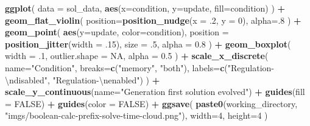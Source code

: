 \documentclass[
]{book}
\newenvironment{Shaded}{\begin{snugshade}}{\end{snugshade}}
\newcommand{\CharTok}[1]{\textcolor[rgb]{0.31,0.60,0.02}{#1}}
\newcommand{\DataTypeTok}[1]{\textcolor[rgb]{0.13,0.29,0.53}{#1}}
\newcommand{\DecValTok}[1]{\textcolor[rgb]{0.00,0.00,0.81}{#1}}
\newcommand{\FloatTok}[1]{\textcolor[rgb]{0.00,0.00,0.81}{#1}}
\newcommand{\KeywordTok}[1]{\textcolor[rgb]{0.13,0.29,0.53}{\textbf{#1}}}
\newcommand{\NormalTok}[1]{#1}
\newcommand{\OperatorTok}[1]{\textcolor[rgb]{0.81,0.36,0.00}{\textbf{#1}}}
\newcommand{\OtherTok}[1]{\textcolor[rgb]{0.56,0.35,0.01}{#1}}
\newcommand{\StringTok}[1]{\textcolor[rgb]{0.31,0.60,0.02}{#1}}
\begin{document}
\begin{Shaded}
\begin{Highlighting}[]
\KeywordTok{ggplot}\NormalTok{( }\DataTypeTok{data =}\NormalTok{ sol\_data, }\KeywordTok{aes}\NormalTok{(}\DataTypeTok{x=}\NormalTok{condition, }\DataTypeTok{y=}\NormalTok{update, }\DataTypeTok{fill=}\NormalTok{condition) ) }\OperatorTok{+}
\StringTok{  }\KeywordTok{geom\_flat\_violin}\NormalTok{(}
    \DataTypeTok{position=}\KeywordTok{position\_nudge}\NormalTok{(}\DataTypeTok{x =} \FloatTok{.2}\NormalTok{, }\DataTypeTok{y =} \DecValTok{0}\NormalTok{),}
    \DataTypeTok{alpha=}\NormalTok{.}\DecValTok{8}
\NormalTok{  ) }\OperatorTok{+}
\StringTok{  }\KeywordTok{geom\_point}\NormalTok{(}
    \KeywordTok{aes}\NormalTok{(}\DataTypeTok{y=}\NormalTok{update, }\DataTypeTok{color=}\NormalTok{condition),}
    \DataTypeTok{position =} \KeywordTok{position\_jitter}\NormalTok{(}\DataTypeTok{width =} \FloatTok{.15}\NormalTok{),}
    \DataTypeTok{size =} \FloatTok{.5}\NormalTok{,}
    \DataTypeTok{alpha =} \FloatTok{0.8}
\NormalTok{  ) }\OperatorTok{+}
\StringTok{  }\KeywordTok{geom\_boxplot}\NormalTok{(}
    \DataTypeTok{width =} \FloatTok{.1}\NormalTok{,}
    \DataTypeTok{outlier.shape =} \OtherTok{NA}\NormalTok{,}
    \DataTypeTok{alpha =} \FloatTok{0.5}
\NormalTok{  ) }\OperatorTok{+}
\StringTok{  }\KeywordTok{scale\_x\_discrete}\NormalTok{(}
    \DataTypeTok{name=}\StringTok{"Condition"}\NormalTok{,}
    \DataTypeTok{breaks=}\KeywordTok{c}\NormalTok{(}\StringTok{"memory"}\NormalTok{, }\StringTok{"both"}\NormalTok{),}
    \DataTypeTok{labels=}\KeywordTok{c}\NormalTok{(}\StringTok{"Regulation{-}}\CharTok{\textbackslash{}n}\StringTok{disabled"}\NormalTok{, }\StringTok{"Regulation{-}}\CharTok{\textbackslash{}n}\StringTok{enabled"}\NormalTok{)}
\NormalTok{  ) }\OperatorTok{+}
\StringTok{  }\KeywordTok{scale\_y\_continuous}\NormalTok{(}\DataTypeTok{name=}\StringTok{"Generation first solution evolved"}\NormalTok{) }\OperatorTok{+}
\StringTok{  }\KeywordTok{guides}\NormalTok{(}\DataTypeTok{fill =} \OtherTok{FALSE}\NormalTok{) }\OperatorTok{+}
\StringTok{  }\KeywordTok{guides}\NormalTok{(}\DataTypeTok{color =} \OtherTok{FALSE}\NormalTok{) }\OperatorTok{+}
\StringTok{  }\KeywordTok{ggsave}\NormalTok{(}
    \KeywordTok{paste0}\NormalTok{(working\_directory, }\StringTok{"imgs/boolean{-}calc{-}prefix{-}solve{-}time{-}cloud.png"}\NormalTok{),}
    \DataTypeTok{width=}\DecValTok{4}\NormalTok{,}
    \DataTypeTok{height=}\DecValTok{4}
\NormalTok{  )}
\end{Highlighting}
\end{Shaded}
\end{document}
